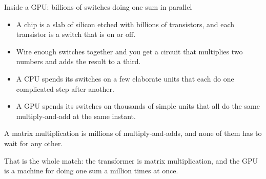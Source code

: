 \documentclass[aspectratio=169,11pt]{beamer}
\begin{document}
\begin{frame}{Inside a GPU: billions of switches doing one sum in parallel}

\begin{itemize}\setlength\itemsep{0.3em}
    \item A chip is a slab of silicon etched with billions of transistors, and each transistor is a switch that is on or off.
    \item Wire enough switches together and you get a circuit that multiplies two numbers and adds the result to a third.
    \item A CPU spends its switches on a few elaborate units that each do one complicated step after another.
    \item A GPU spends its switches on thousands of simple units that all do the same multiply-and-add at the same instant.
\end{itemize}

\vspace{0.2cm}

A matrix multiplication is millions of multiply-and-adds, and none of them has to wait for any other.

\vspace{0.2cm}

\alert{That is the whole match: the transformer is matrix multiplication, and the GPU is a machine for doing one sum a million times at once.}

\end{frame}
\end{document}
